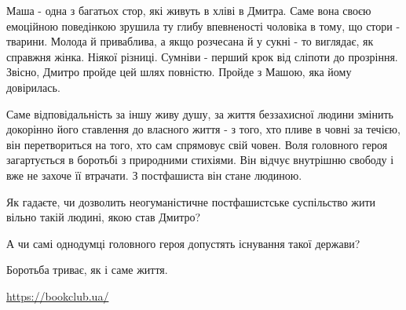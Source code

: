 Маша - одна з багатьох стор, які живуть в хліві в Дмитра. Саме вона своєю
емоційною поведінкою зрушила ту глибу впевненості чоловіка в тому, що стори -
тварини. Молода й приваблива, а якщо розчесана й у сукні - то виглядає, як
справжня жінка. Ніякої різниці. Сумніви - перший крок від сліпоти до прозріння.
Звісно, Дмитро пройде цей шлях повністю. Пройде з Машою, яка йому довірилась. 

Саме відповідальність за іншу живу душу, за життя беззахисної людини змінить
докорінно його ставлення до власного життя - з того, хто пливе в човні за
течією, він перетвориться на того, хто сам спрямовує свій човен. Воля головного
героя загартується в боротьбі з природними стихіями. Він відчує внутрішню
свободу і вже не захоче її втрачати. З постфашиста він стане людиною. 

Як гадаєте, чи дозволить неогуманістичне постфашистське суспільство жити вільно
такій людині, якою став Дмитро? 

А чи самі однодумці головного героя допустять існування такої держави?

Боротьба триває, як і саме життя. 

\url{https://bookclub.ua/}
